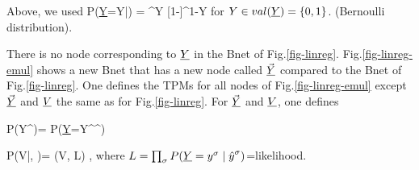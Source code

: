 Above, we used
\beq
P(\ul{Y}=Y|\haty) = \haty^{Y}
[1-\haty]^{1-Y}
\eeq
for $Y\in val(\ul{Y})=\{0,1\}$. (Bernoulli distribution).

There is no node corresponding to $\ul{Y}$
in the Bnet of Fig.\ref{fig-linreg}.
Fig.\ref{fig-linreg-emul} shows a new Bnet
that has a new node called $\vec{\ul{Y}}$
compared to the Bnet of Fig.\ref{fig-linreg}.
One defines the TPMs
for all nodes of Fig.\ref{fig-linreg-emul}
except $\vec{\ul{Y}}$ and $\ul{V}$ the same
as for Fig.\ref{fig-linreg}. For $\vec{\ul{Y}}$
and $\ul{V}$, one defines

\beq\color{blue}
P(Y^\s\mid \vec{\haty})=
P(\ul{Y}=Y^\s\mid \haty^\s)
\eeq

\beq\color{blue}
P(V|, \vecy)=
\delta(V, \ln  L)
\;,
\eeq
where $ L =\prod_\s P(\ul{Y}=y^\s\mid \haty^\s )$=likelihood.
